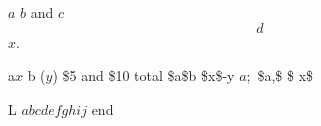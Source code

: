 \documentclass[11pt]{article}
\author{root}
\date{\today}
\title{}
\begin{document}
\tableofcontents

\(a\) \(b\) and \(c\)  $$d$$ \(x\).

a\(x\) b (\(y\)) \$5 and \$10 total \$a\$b \$x\$-y \(a;\) \$a,\$ \$ x\$

L \(ab
cd
ef
gh
ij\) end
\end{document}

